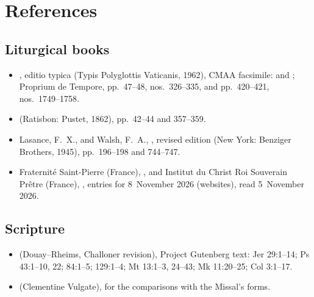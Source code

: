 \section{References}
\label{sec:references}

{\small
\subsection*{Liturgical books}
\begin{itemize}[leftmargin=1.2em,itemsep=.25em]
\item {}, editio typica (Typis
Polyglottis Vaticanis, 1962), CMAA facsimile:  and
; Proprium de Tempore, pp.~47--48,
nos.~326--335, and pp.~420--421, nos.~1749--1758.
\item {} (Ratisbon: Pustet, 1862), pp.~42--44 and
357--359.
\item Lasance, F.~X., and Walsh, F.~A., , revised edition (New York: Benziger Brothers, 1945), pp.~196--198
and 744--747.
\item Fraternité Saint-Pierre (France), , and Institut du
Christ Roi Souverain Prêtre (France), , entries for 8~November 2026
(websites), read 5~November 2026.
\end{itemize}

\subsection*{Scripture}
\begin{itemize}[leftmargin=1.2em,itemsep=.25em]
\item {} (Douay--Rheims,
Challoner revision), Project Gutenberg text: Jer 29:1--14; Ps 43:1--10, 22;
84:1--5; 129:1--4; Mt 13:1--3, 24--43; Mk 11:20--25; Col 3:1--17.
\item {} (Clementine Vulgate), for the
comparisons with the Missal's forms.
\end{itemize}

}
